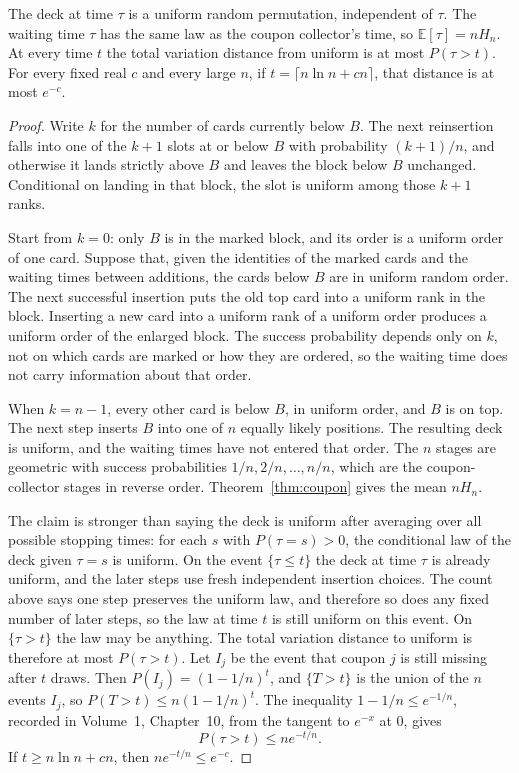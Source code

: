 \begin{theorem}\label{thm:top}
The deck at time $\tau$ is a uniform random permutation, independent of $\tau$. The waiting time $\tau$ has the same law as the coupon collector's time, so $\mathbb E[\tau]=n H_n$. At every time $t$ the total variation distance from uniform is at most $P(\tau>t)$. For every fixed real $c$ and every large $n$, if $t=\lceil n\ln n+cn\rceil$, that distance is at most $e^{-c}$.
\end{theorem}
\begin{proof}
Write $k$ for the number of cards currently below $B$. The next reinsertion falls into one of the $k+1$ slots at or below $B$ with probability $(k+1)/n$, and otherwise it lands strictly above $B$ and leaves the block below $B$ unchanged. Conditional on landing in that block, the slot is uniform among those $k+1$ ranks.

Start from $k=0$: only $B$ is in the marked block, and its order is a uniform order of one card. Suppose that, given the identities of the marked cards and the waiting times between additions, the cards below $B$ are in uniform random order. The next successful insertion puts the old top card into a uniform rank in the block. Inserting a new card into a uniform rank of a uniform order produces a uniform order of the enlarged block. The success probability depends only on $k$, not on which cards are marked or how they are ordered, so the waiting time does not carry information about that order.

When $k=n-1$, every other card is below $B$, in uniform order, and $B$ is on top. The next step inserts $B$ into one of $n$ equally likely positions. The resulting deck is uniform, and the waiting times have not entered that order. The $n$ stages are geometric with success probabilities $1/n,2/n,\ldots,n/n$, which are the coupon-collector stages in reverse order. Theorem~\ref{thm:coupon} gives the mean $nH_n$.

The claim is stronger than saying the deck is uniform after averaging over all possible stopping times: for each $s$ with $P(\tau=s)>0$, the conditional law of the deck given $\tau=s$ is uniform. On the event $\{\tau\le t\}$ the deck at time $\tau$ is already uniform, and the later steps use fresh independent insertion choices. The count above says one step preserves the uniform law, and therefore so does any fixed number of later steps, so the law at time $t$ is still uniform on this event. On $\{\tau>t\}$ the law may be anything. The total variation distance to uniform is therefore at most $P(\tau>t)$. Let $I_j$ be the event that coupon $j$ is still missing after $t$ draws. Then $P(I_j)=(1-1/n)^t$, and $\{T>t\}$ is the union of the $n$ events $I_j$, so $P(T>t)\le n(1-1/n)^t$. The inequality $1-1/n\le e^{-1/n}$, recorded in Volume~1, Chapter~10, from the tangent to $e^{-x}$ at $0$, gives
\[
 P(\tau>t)\le n e^{-t/n}.
\]
If $t\ge n\ln n+cn$, then $n e^{-t/n}\le e^{-c}$.
\end{proof}

